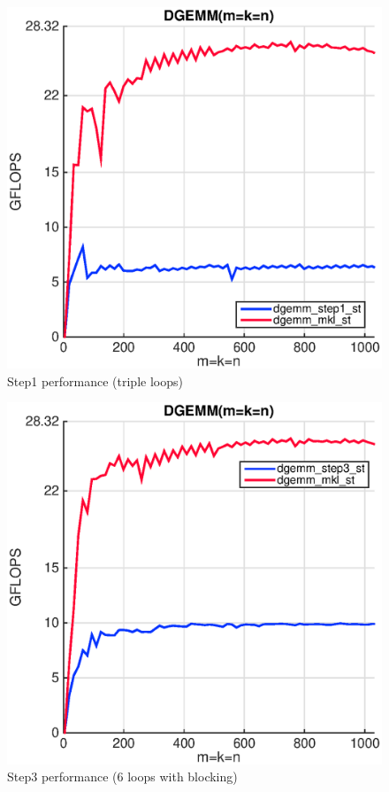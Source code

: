 \begin{figure}[!htp]
  \centering
  \includegraphics[scale=.5]{figures/step1_single_thread_ivy.eps}
  \caption{Step1 performance (triple loops)}
  \label{fig:naive}
\end{figure} 

\begin{figure}[!htp]
  \centering
  \includegraphics[scale=.5]{figures/step3_single_thread_ivy.eps}
  \caption{Step3 performance (6 loops with blocking)}
  \label{fig:packing}
\end{figure} 

